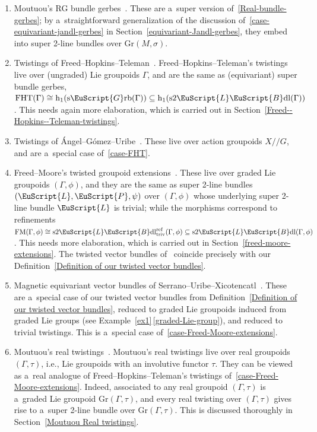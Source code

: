 \documentclass[10pt,a4paper]{amsart}
\numberwithin{equation}{section}
\def\mathscr#1{\EuScript{#1}}
\def\hc#1{\mathrm{h}_{#1}}
\def\subset{\subseteq}
\def\act#1#2{#1/\!\!/#2}
\newcommand{\LineBdl}{\mathscr{L}\mathscr{B}\mathrm{dl}}
\newcommand{\stwoLineBdl}{\mathrm{s}2\LineBdl}
\newcommand{\stwoLineBdltriv}{\mathrm{s}2\LineBdl_{\mathrm{triv}}}
\newcommand{\Grb}{\mathscr{G}\mathrm{rb}}
\newcommand{\sGrb}{\mathrm{s}\Grb}
\def\Gr{\mathrm{Gr}}
\begin{document}
\begin{enumerate}[(1)]
\item
Moutuou's RG bundle gerbes~\cite{mohamedmoutuou2012}.
These are a~super version of~\ref{Real-bundle-gerbes}; by a~straightforward generalization of the discussion of~\ref{case-equivariant-jandl-gerbes} in Section~\ref{equivariant-Jandl-gerbes}, they embed into super 2-line bundles over
$\Gr(M,\sigma)$.

 \item
\label{case-FHT}
Twistings of Freed--Hopkins--Teleman~\cite{Freed2011a}.
Freed--Hopkins--Teleman's twistings live over (ungraded) Lie groupoids $\Gamma$, and are the same as (equivariant) super bundle gerbes,
$
\mathrm{FHT}(\Gamma) \cong \hc 1(\sGrb(\Gamma))\subset \hc 1(\stwoLineBdl(\Gamma))$.
This needs again more elaboration, which is carried out in Section~\ref{Freed--Hopkins--Teleman-twistings}.

\item
Twistings of \'Angel--G\'omez--Uribe~\cite{Angel2018}.
These live over action groupoids $\act XG$, and are a~special
case of~\ref{case-FHT}.


\item
\label{case-Freed-Moore-extensions}
Freed--Moore's twisted groupoid extensions~\cite{Freeda}.
These live over graded Lie groupoids $(\Gamma,\phi)$, and they are the same as super 2-line bundles~$(\mathscr{L},\mathscr{P},\psi)$ over $(\Gamma,\phi)$ whose underlying super 2-line bundle $\mathscr{L}$ is trivial; while the morphisms correspond to refinements
$
\mathrm{FM}(\Gamma,\phi)\cong \stwoLineBdltriv^{\text{ref}}(\Gamma,\phi) \subset \stwoLineBdl(\Gamma,\phi)
$.
This needs more elaboration, which is carried out in Section~\ref{freed-moore-extensions}. The twisted vector bundles of~\cite{Freeda} coincide precisely with our Definition~\ref{Definition of our twisted vector bundles}.

\item
Magnetic equivariant vector bundles of Serrano--Uribe--Xicotencatl~\cite{serrano2024rationalmagneticequivariantktheory}.
These are a~special case of our twisted vector bundles from Definition~\ref{Definition of our twisted vector bundles}, reduced to graded Lie groupoids induced from graded Lie groups (see Example~\ref{ex1}\,\ref{graded-Lie-group}), and reduced to trivial twistings. This is a~special case of~\ref{case-Freed-Moore-extensions}.

\item
\label{Moutuou}
Moutuou's real twistings~\cite{mohamedmoutuou2012}.
Moutuou's real twistings live over real groupoids $(\Gamma,\tau)$, i.e., Lie groupoids with an involutive functor $\tau$. They can be viewed as a~real analogue of Freed--Hopkins--Teleman's twistings of~\ref{case-Freed-Moore-extensions}. Indeed, associated to any real groupoid $(\Gamma,\tau)$ is a~graded Lie groupoid $\Gr(\Gamma,\tau)$, and every
real twisting over $(\Gamma,\tau)$ gives rise to a~super 2-line bundle over $\Gr(\Gamma,\tau)$. This is discussed thoroughly in Section~\ref{Moutuou Real twistings}.


\end{enumerate}
\end{document}
